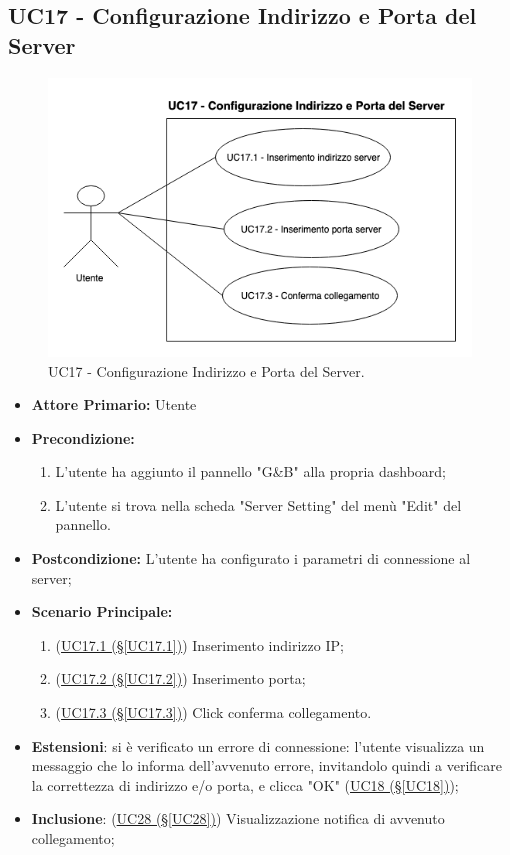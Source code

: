 \pagebreak

\subsection{UC17 - Configurazione Indirizzo e Porta del Server}\label{UC17}
\begin{figure}[H]
	\centering
	\includegraphics[scale=0.65]{./images/UC17.png}
	\caption{UC17 - Configurazione Indirizzo e Porta del Server.}
\end{figure}
\begin{itemize}
	\item \textbf{Attore Primario:}  Utente
	\item \textbf{Precondizione:} 
		\begin{enumerate}
			\item L'utente ha aggiunto il pannello "G\&B" alla propria dashboard;
			\item L'utente si trova nella scheda "Server Setting" del menù "Edit" del pannello.
		\end{enumerate}	
	\item \textbf{Postcondizione:} L'utente ha configurato i parametri di connessione al server;
	\item \textbf{Scenario Principale:}
	\begin{enumerate}
		\item (\hyperref[UC17.1]{UC17.1 (§\ref*{UC17.1})}) Inserimento indirizzo IP; 
		\item (\hyperref[UC17.2]{UC17.2 (§\ref*{UC17.2})}) Inserimento porta;
		\item (\hyperref[UC17.3]{UC17.3 (§\ref*{UC17.3})}) Click conferma collegamento.
	\end{enumerate}
	\item \textbf{Estensioni}: si è verificato un errore di connessione: l'utente visualizza un messaggio che lo informa dell'avvenuto errore, invitandolo quindi a verificare la correttezza di indirizzo e/o porta, e clicca "OK" (\hyperref[UC18]{UC18 (§\ref*{UC18})});
	\item  \textbf{Inclusione}: (\hyperref[UC28]{UC28 (§\ref*{UC28})}) Visualizzazione notifica di avvenuto collegamento;
\end{itemize}

